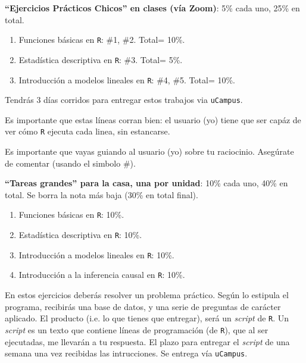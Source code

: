 \documentclass[letterpaper]{article}
\renewenvironment{itemize}{
  \begin{list}{}{
    \setlength{\leftmargin}{1.5em}
  }
}{
  \end{list}
}
\begin{document}
\begin{enumerate}
	\item {\bf ``Ejercicios Pr\'acticos Chicos'' en clases (v\'ia Zoom)}: 5\% cada uno, 25\% en total.

		\begin{enumerate}
			\item Funciones b\'asicas en \texttt{R}: \#1, \#2. Total= 10\%.
			\item Estad\'istica descriptiva en \texttt{R}: \#3. Total= 5\%.
			\item Introducci\'on a modelos lineales en \texttt{R}: \#4, \#5. Total= 10\%.
		\end{enumerate}

Tendr\'as 3 d\'ias corridos para entregar estos trabajos via \texttt{uCampus}.

\begin{itemize}
		\item[\Pointinghand] Es importante que estas l\'ineas corran bien: el usuario (yo) tiene que ser cap\'az de ver c\'omo \texttt{R} ejecuta cada linea, sin estancarse.
		\item[\Pointinghand] Es importante que vayas guiando al usuario (yo) sobre tu raciocinio. Aseg\'urate de comentar (usando el simbolo \#).
\end{itemize}


	\item {\bf ``Tareas grandes'' para la casa, una por unidad}: 10\% cada uno, 40\% en total. Se borra la nota m\'as baja (30\% en total final).

		\begin{enumerate}
			\item Funciones b\'asicas en \texttt{R}: 10\%.
			\item Estad\'istica descriptiva en \texttt{R}: 10\%.
			\item Introducci\'on a modelos lineales en \texttt{R}: 10\%.
      \item Introducci\'on a la inferencia causal en \texttt{R}: 10\%.
		\end{enumerate}


	En estos ejercicios deber\'as resolver un problema pr\'actico. Seg\'un lo estipula el programa, recibir\'as una base de datos, y una serie de preguntas de car\'acter aplicado. El producto (i.e. lo que tienes que entregar), ser\'a un \emph{script} de \texttt{R}. Un \emph{script} es un texto que contiene l\'ineas de programaci\'on (de \texttt{R}), que al ser ejecutadas, me llevar\'an a tu respuesta. El plazo para entregar el \emph{script} de una semana una vez recibidas las intrucciones. Se entrega v\'ia \texttt{uCampus}.



\end{enumerate}
\end{document}
